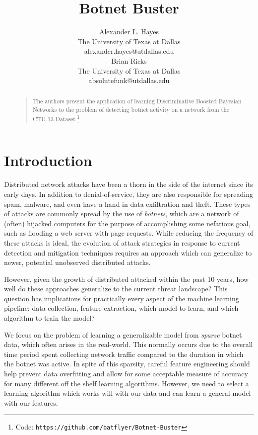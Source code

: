 \documentclass[letterpaper]{article}
\begin{document}
%
\title{Botnet Buster}
\author{Alexander L. Hayes\\
The University of Texas at Dallas\\
alexander.hayes@utdallas.edu\\
\And
Brian Ricks\\
The University of Texas at Dallas\\
absolutefunk@utdallas.edu\\
}

\maketitle
\begin{abstract}
\begin{quote}
The authors present the application of learning Discriminative Boosted Bayesian Networks to the problem of detecting botnet activity on a network from the CTU-13-Dataset.\footnote{Code: \texttt{https://github.com/batflyer/Botnet-Buster}}
\end{quote}
\end{abstract}

\section{Introduction}
Distributed network attacks have been a thorn in the side of the internet since its early days.  In addition to denial-of-service, they are also responsible for spreading spam, malware, and even have a hand in data exfiltration and theft.  These types of attacks are commonly spread by the use of \emph{botnets}, which are a network of (often) hijacked computers for the purpose of accomplishing some nefarious goal, such as flooding a web server with page requests.  While reducing the frequency of these attacks is ideal, the evolution of attack strategies in response to current detection and mitigation techniques requires an approach which can generalize to newer, potential unobserved distributed attacks.

However, given the growth of distributed attacked within the past 10 years, how well do these approaches generalize to the current threat landscape?  This question has implications for practically every aspect of the machine learning pipeline: data collection, feature extraction, which model to learn, and which algorithm to train the model?

We focus on the problem of learning a generalizable model from \emph{sparse} botnet data, which often arises in the real-world.  This normally occurs due to the overall time period spent collecting network traffic compared to the duration in which the botnet was active.  In spite of this sparsity, careful feature engineering should help prevent data overfitting and allow for some acceptable measure of accuracy for many different off the shelf learning algorithms.  However, we need to select a learning algorithm which works will with our data and can learn a general model with our features.
\end{document}
